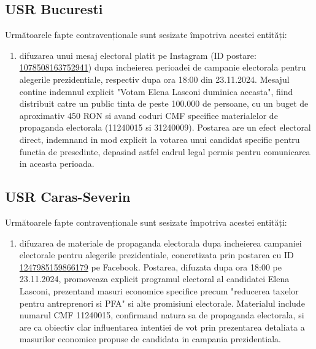 \documentclass[a4paper,12pt]{article}
\begin{document}
\vspace{0.5cm}

\subsection{USR Bucuresti}
Următoarele fapte contravenționale sunt sesizate împotriva acestei entități:

\begin{enumerate}[leftmargin=*, label=\arabic*.)]
    \item difuzarea unui mesaj electoral platit pe Instagram (ID postare: \href{https://www.facebook.com/ads/library/?id=1078508163752941}{1078508163752941}) dupa incheierea perioadei de campanie electorala pentru alegerile prezidentiale, respectiv dupa ora 18:00 din 23.11.2024. Mesajul contine indemnul explicit "Votam Elena Lasconi duminica aceasta", fiind distribuit catre un public tinta de peste 100.000 de persoane, cu un buget de aproximativ 450 RON si avand coduri CMF specifice materialelor de propaganda electorala (11240015 si 31240009). Postarea are un efect electoral direct, indemnand in mod explicit la votarea unui candidat specific pentru functia de presedinte, depasind astfel cadrul legal permis pentru comunicarea in aceasta perioada.
\end{enumerate}

\vspace{0.5cm}

\subsection{USR Caras-Severin}
Următoarele fapte contravenționale sunt sesizate împotriva acestei entități:

\begin{enumerate}[leftmargin=*, label=\arabic*.)]
    \item difuzarea de materiale de propaganda electorala dupa incheierea campaniei electorale pentru alegerile prezidentiale, concretizata prin postarea cu ID \href{https://www.facebook.com/ads/library/?id=1247985159866179}{1247985159866179} pe Facebook. Postarea, difuzata dupa ora 18:00 pe 23.11.2024, promoveaza explicit programul electoral al candidatei Elena Lasconi, prezentand masuri economice specifice precum "reducerea taxelor pentru antreprenori si PFA" si alte promisiuni electorale. Materialul include numarul CMF 11240015, confirmand natura sa de propaganda electorala, si are ca obiectiv clar influentarea intentiei de vot prin prezentarea detaliata a masurilor economice propuse de candidata in campania prezidentiala.
\end{enumerate}
\end{document}
